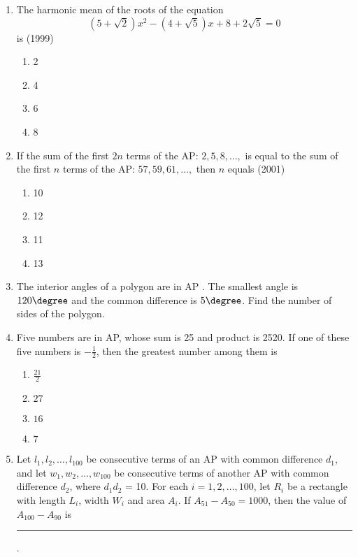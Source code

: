 \begin{enumerate}    [label=\thesubsection.\arabic*, ref=\thesubsection.\theenumi]
\begin{multicols}{4}
        \end{multicols}
\item The harmonic mean of the roots of the equation
        $$(5+\sqrt{2})x^2-(4+\sqrt{5})x+8+2\sqrt{5}=0$$ is 
        \hfill(1999)
%            
%        
        \begin{multicols}{4}
\begin{enumerate}    
            \item 2
            \item 4
            \item 6
            \item 8
        \end{enumerate}
        \end{multicols}
\item If the sum of the first $2n$ terms of the AP: $2, 5, 8, \dots, $ is equal to the sum of the first $n$ terms of the AP: $ 57, 59, 61, \dots, $ then $n$ equals \hfill(2001)
        \begin{multicols}{4}
\begin{enumerate}    
            \item 10
            \item 12
            \item 11
            \item 13
            \end{enumerate}
            \end{multicols}
%
\item The interior angles of a polygon are in  AP . The smallest angle is $120\degree$ and the common difference is $5\degree$. Find the number of sides of the polygon.
%
\hfill{}
%
%    
\item     Five numbers are in AP, whose sum is 25 and product is 2520. If one of these five numbers is $-\frac{1}{2}$, then the greatest number among them is
\hfill {}
%
\begin{multicols}{4}
\begin{enumerate}    
\item     $\frac{21}{2}$
\item     $27$
\item     $16$
\item     $7$
\end{enumerate}
\end{multicols}
%
%     
%
\item     Let $l_1,l_2,\dots,l_{100}$ be consecutive terms of an  AP  with common difference $d_1$, and let $w_1, w_2, \dots , w_{100}$ be consecutive terms of another  AP  with common difference $d_2 $, where $d_1d_2$ = 10. For each $i = 1, 2,\dots,100$, let $R_i$ be a rectangle with length $L_i$, width $W_i$ and area $A_i$. If $A_{51}-A_{50}=1000$, then the value of $A_{100}-A_{90}$ is \rule{1cm}{0.1pt}.

\end{enumerate}
